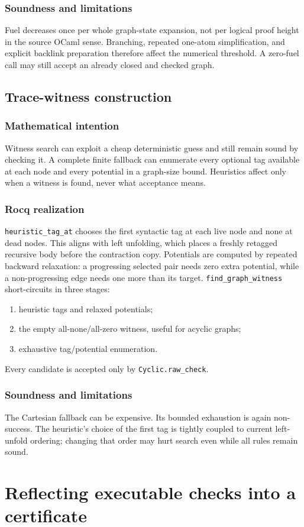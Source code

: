 \documentclass[11pt,oneside]{book}
\DeclareRobustCommand{\code}[1]{\nolinkurl{#1}}
\newcommand{\mathintent}{\subsection*{Mathematical intention}}
\newcommand{\rocqreal}{\subsection*{Rocq realization}}
\newcommand{\soundlim}{\subsection*{Soundness and limitations}}
\begin{document}
\soundlim

Fuel decreases once per whole graph-state expansion, not per logical proof
height in the source OCaml sense.  Branching, repeated one-atom simplification,
and explicit backlink preparation therefore affect the numerical threshold.
A zero-fuel call may still accept an already closed and checked graph.

\section{Trace-witness construction}

\mathintent

Witness search can exploit a cheap deterministic guess and still remain sound
by checking it.  A complete finite fallback can enumerate every optional tag
available at each node and every potential in a graph-size bound.  Heuristics
affect only when a witness is found, never what acceptance means.

\rocqreal

\code{heuristic_tag_at} chooses the first syntactic tag at each live node and
none at dead nodes.  This aligns with left unfolding, which places a freshly
retagged recursive body before the contraction copy.  Potentials are computed
by repeated backward relaxation: a progressing selected pair needs zero extra
potential, while a non-progressing edge needs one more than its target.
\code{find_graph_witness} short-circuits in three stages:
\begin{enumerate}[leftmargin=*]
\item heuristic tags and relaxed potentials;
\item the empty all-none/all-zero witness, useful for acyclic graphs;
\item exhaustive tag/potential enumeration.
\end{enumerate}
Every candidate is accepted only by \code{Cyclic.raw_check}.

\soundlim

The Cartesian fallback can be expensive.  Its bounded exhaustion is again
non-success.  The heuristic's choice of the first tag is tightly coupled to
current left-unfold ordering; changing that order may hurt search even while
all rules remain sound.

\chapter{Reflecting executable checks into a certificate}
\label{ch:certification}
\end{document}
